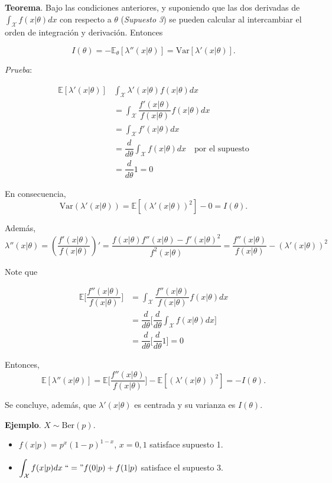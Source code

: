\documentclass[
  12pt,
]{book}
\begin{document}
\textbf{Teorema}. Bajo las condiciones anteriores, y suponiendo que las dos derivadas de \(\int_{\mathcal X}f(x|\theta)dx\) con respecto a \(\theta\) (\emph{Supuesto 3}) se pueden calcular al intercambiar el orden de integración y derivación. Entonces

\[I(\theta) = -\mathbb E_{\theta}[\lambda''(x|\theta)] = \text{Var}[\lambda'(x|\theta)].\]

\emph{Prueba}:

\begin{align*}
\mathbb E[\lambda'(x|\theta)] & \int_{\mathcal X}\lambda'(x|\theta)f(x|\theta)dx\\
& = \int_{\mathcal X} \dfrac{f'(x|\theta)}{f(x|\theta)}f(x|\theta)dx\\
& =  \int_{\mathcal X}f'(x|\theta)dx\\
& = \dfrac d{d\theta}\int_{\mathcal X}f(x|\theta)dx \quad \text{por el supuesto}\\
& = \dfrac d{d\theta}1 = 0
\end{align*}

En consecuencia,
\[\text{Var}(\lambda'(x|\theta)) = \mathbb E[(\lambda'(x|\theta))^2]-0 = I(\theta).\]

Además,
\[\lambda''(x|\theta)= \left(\dfrac{f'(x|\theta)}{f(x|\theta)}\right)' = \dfrac{f(x|\theta)f''(x|\theta)-f'(x|\theta)^2}{f^2(x|\theta)} =\dfrac{f''(x|\theta)}{f(x|\theta)} - (\lambda'(x|\theta))^2 \]

Note que

\begin{align*}
\mathbb E\bigg[\dfrac{f''(x|\theta)}{f(x|\theta)} \bigg] & = \int_{\mathcal X}\dfrac{f''(x|\theta)}{f(x|\theta)} f(x|\theta)dx \\
&=\dfrac{d}{d\theta}\bigg[\dfrac{d}{d\theta}\int_{\mathcal X}f(x|\theta)dx\bigg]\\
& = \dfrac{d}{d\theta}\bigg[\dfrac{d}{d\theta}1\bigg] = 0
\end{align*}

Entonces,
\[\mathbb E[\lambda''(x|\theta)] =\mathbb E\bigg[\dfrac{f''(x|\theta)}{f(x|\theta)} \bigg] - \mathbb E[(\lambda'(x|\theta))^2] = -I(\theta). \]

Se concluye, además, que \(\lambda'(x|\theta)\) es centrada y su varianza es \(I(\theta)\).

\textbf{Ejemplo}. \(X\sim \text{Ber}(p)\).

\begin{itemize}
\item
  \(f(x|p) = p^x(1-p)^{1-x}\), \(x=0,1\) satisface supuesto 1.
\item
  \(\displaystyle\int_{\mathcal X}f(x|p)dx \;``=" f(0|p)+f(1|p)\) satisface el supuesto 3.
\end{itemize}
\end{document}
